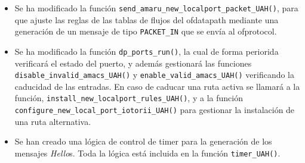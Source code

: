 \begin{itemize}
    \item Se ha modificado la función \texttt{send\_amaru\_new\_localport\_packet\_UAH()}, para que ajuste las reglas de las tablas de flujos del ofdatapath mediante una generación de un mensaje de tipo \texttt{PACKET\_IN} que se envía al ofprotocol.
    \item Se ha modificado la función \texttt{dp\_ports\_run()}, la cual de forma periorida verificará el estado del puerto, y además gestionará las funciones \texttt{disable\_invalid\_amacs\_UAH()} y \texttt{enable\_valid\_amacs\_UAH()} verificando la caducidad de las entradas. En caso de caducar una ruta activa se llamará a la función, \texttt{install\_new\_localport\_rules\_UAH()}, y a la función \texttt{configure\_new\_local\_port\_iotorii\_UAH()} para gestionar la instalación de una ruta alternativa.
    \item Se han creado una lógica de control de timer para la generación de los mensajes \textit{Hello}s. Toda la lógica está incluida en la función \texttt{timer\_UAH()}.
\end{itemize}